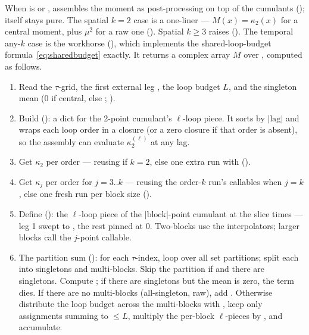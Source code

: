 When  is  or , 
assembles the moment as post-processing on top of the cumulants
();  itself stays
pure. The spatial $k=2$ case is a one-liner --- $M(x) = \kappa_2(x)$ for a central
moment, plus $\mu^2$ for a raw one (). Spatial
$k\ge 3$ raises  ().
The temporal any-$k$ case is the workhorse 
(), which implements the shared-loop-budget
formula~\eqref{eq:sharedbudget} exactly. It returns a complex array $M$ over
, computed as follows.

\begin{enumerate}
  \item Read the $\tau$-grid, the first external leg , the loop budget
        $L$, and the singleton mean  (0 if central, else
        ; ).
  \item Build  (): a
        dict  for the 2-point cumulant's $\ell$-loop
        piece. It sorts by $|\text{lag}|$ and wraps each loop order in a
         closure (or a zero closure if that order is absent), so
        the assembly can evaluate $\kappa_2^{(\ell)}$ at any lag.
  \item Get $\kappa_2$ per order --- reusing  if $k=2$, else one extra
         run with 
        ().
  \item Get $\kappa_j$ per order for $j=3..k$ --- reusing the order-$k$ run's
         callables when $j=k$, else one fresh run per
        block size ().
  \item Define  ():
        the $\ell$-loop piece of the $|\text{block}|$-point cumulant at the slice
        times --- leg 1 swept to , the rest pinned at 0. Two-blocks
        use the interpolators; larger blocks call the $j$-point callable.
  \item The partition sum (): for each
        $\tau$-index, loop over all set partitions; split each into singletons and
        multi-blocks. Skip the partition if  and there are
        singletons. Compute ; if there are
        singletons but the mean is zero, the term dies. If there are no
        multi-blocks (all-singleton, raw), add . Otherwise
        distribute the loop budget across the multi-blocks with
        , keep only
        assignments summing to $\le L$, multiply the per-block $\ell$-pieces by
        , and accumulate.
\end{enumerate}

